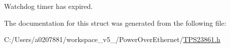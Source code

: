 Watchdog timer has expired. 



The documentation for this struct was generated from the following file\-:\begin{DoxyCompactItemize}
\item 
C\-:/\-Users/a0207881/workspace\-\_\-v5\-\_/\-Power\-Over\-Ethernet/\hyperlink{_t_p_s23861_8h}{T\-P\-S23861.\-h}\end{DoxyCompactItemize}

